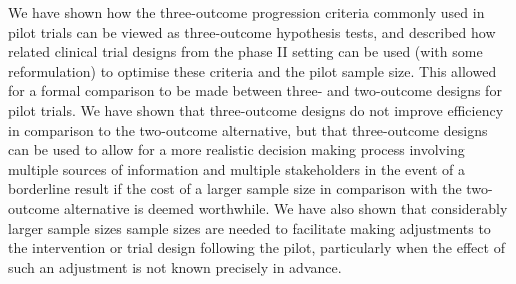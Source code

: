\documentclass{bmcart}
\begin{document}



We have shown how the three-outcome progression criteria commonly used in pilot trials can be viewed as three-outcome hypothesis tests, and described how related clinical trial designs from the phase II setting can be used (with some reformulation) to optimise these criteria and the pilot sample size. This allowed for a formal comparison to be made between three- and two-outcome designs for pilot trials. We have shown that three-outcome designs do not improve efficiency in comparison to the two-outcome alternative, but that three-outcome designs can be used to allow for a more realistic decision making process involving multiple sources of information and multiple stakeholders in the event of a borderline result if the cost of a larger sample size in comparison with the two-outcome alternative is deemed worthwhile. We have also shown that considerably larger sample sizes sample sizes are needed to facilitate making adjustments to the intervention or trial design following the pilot, particularly when the effect of such an adjustment is not known precisely in advance. 
\end{document}
